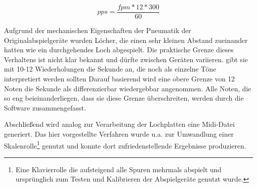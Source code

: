\begin{equation} \label{eq:1}
    pps = \frac{fpm * 12 * 300}{60}
\end{equation}

Aufgrund der mechanischen Eigenschaften der Pneumatik der Originalabspielgeräte wurden Löcher, die einen sehr kleinen Abstand zueinander hatten wie ein durchgehendes Loch abgespielt.
Die praktische Grenze dieses Verhaltens ist nicht klar bekannt und dürfte zwischen Geräten variieren.
\textcite[7]{zoltan_1994} gibt sie mit 10-12 Wiederholungen die Sekunde an, die noch als einzelne Töne interpretiert werden sollten
Darauf basierend wird eine obere Grenze von 12 Noten die Sekunde als differenzierbar wiedergebbar angenommen.
Alle Noten, die so eng beieinanderliegen, dass sie diese Grenze überschreiten, werden durch die Software zusammengefasst.

Abschließend wird analog zur Verarbeitung der Lochplatten eine Midi-Datei generiert.
Das hier vorgestellte Verfahren wurde u.a. zur Umwandlung einer Skalenrolle\footnote{Eine Klavierrolle die aufsteigend alle Spuren mehrmals abspielt und ursprünglich zum Testen und Kalibrieren der Abspielgeräte genutzt wurde.} genutzt und konnte dort zufriedenstellende Ergebnisse produzieren.
